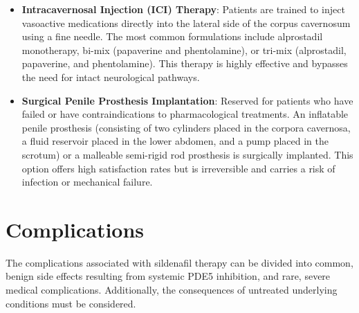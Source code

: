 \begin{itemize}
    \item \textbf{Intracavernosal Injection (ICI) Therapy}: Patients are trained to inject vasoactive medications directly into the lateral side of the corpus cavernosum using a fine needle. The most common formulations include alprostadil monotherapy, bi-mix (papaverine and phentolamine), or tri-mix (alprostadil, papaverine, and phentolamine). This therapy is highly effective and bypasses the need for intact neurological pathways.
    \item \textbf{Surgical Penile Prosthesis Implantation}: Reserved for patients who have failed or have contraindications to pharmacological treatments. An inflatable penile prosthesis (consisting of two cylinders placed in the corpora cavernosa, a fluid reservoir placed in the lower abdomen, and a pump placed in the scrotum) or a malleable semi-rigid rod prosthesis is surgically implanted. This option offers high satisfaction rates but is irreversible and carries a risk of infection or mechanical failure.
\end{itemize}

\section*{Complications}
The complications associated with sildenafil therapy can be divided into common, benign side effects resulting from systemic PDE5 inhibition, and rare, severe medical complications. Additionally, the consequences of untreated underlying conditions must be considered.

